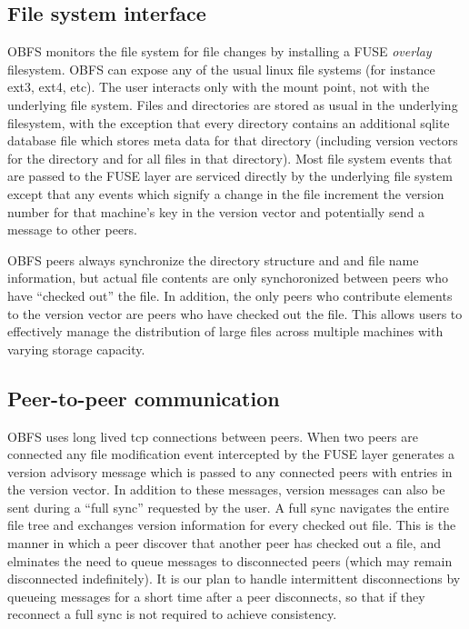 \documentclass[10pt,twocolumn]{article}
\begin{document}
\subsection{File system interface}
OBFS monitors the file system for file changes by installing a FUSE 
\emph{overlay} filesystem. OBFS can expose any of the usual linux file systems
(for instance ext3, ext4, etc). The user interacts only with the mount point,
not with the underlying file system. Files and directories are stored as usual
in the underlying filesystem, with the exception that every directory contains
an additional sqlite database file which stores meta data for that directory
(including version vectors for the directory and for all files in that 
directory). Most file system events that are passed to the FUSE layer are
serviced directly by the underlying file system except that any events which
signify a change in the file increment the version number for that machine's
key in the version vector and potentially send a message to other peers. 

OBFS peers always synchronize the directory structure and and file name information, but actual file contents are only synchoronized between peers who have
``checked out'' the file. In addition, the only peers who contribute elements 
to the version vector are peers who have checked out the file. This allows
users to effectively manage the distribution of large files across multiple 
machines with varying storage capacity. 

\subsection{Peer-to-peer communication}
OBFS uses long lived tcp connections between peers. When two peers are connected
any file modification event intercepted by the FUSE layer generates a version
advisory message which is passed to any connected peers with entries in the 
version vector. In addition to these messages, version messages can also be
sent during a ``full sync'' requested by the user. A full sync navigates the
entire file tree and exchanges version information for every checked out file. 
This is the manner in which a peer discover that another peer has checked out
a file, and elminates the need to queue messages to disconnected peers 
(which may remain disconnected indefinitely). It is our plan to handle
intermittent disconnections by queueing messages for a short time after a 
peer disconnects, so that if they reconnect a full sync is not required to
achieve consistency. 
\end{document}
